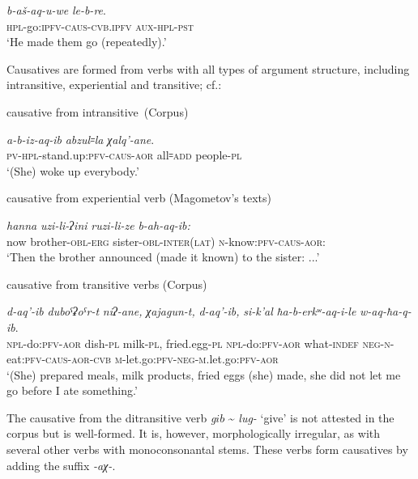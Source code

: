 \documentclass[output=paper]{langsci/langscibook}
\begin{document}
\ea %
\gll \emph{b-aš-aq-u-we} \emph{le-b-re}.\\
\textsc{hpl}-go:\textsc{ipfv}-\textsc{caus}-\textsc{cvb.ipfv} \textsc{aux}-\textsc{hpl}-\textsc{pst}\\
\glt `He made them go (repeatedly).'
\z

Causatives are formed from verbs with all types of argument structure,
including intransitive, experiential and transitive; cf.:

\ea %
causative from intransitive~(Corpus)

\gll \emph{a-b-iz-aq-ib} \emph{abzul꞊la} \emph{χalq'-ane}.\\
\textsc{pv}-\textsc{hpl}-stand.up:\textsc{pfv}-\textsc{caus}-\textsc{aor} all꞊\textsc{add} people-\textsc{pl}\\
\glt `(She) woke up everybody.'

\ex %
causative from experiential verb (Magometov's texts)

\nopagebreak

\gll \emph{hanna} \emph{uzi-li-ʔini} \emph{ruzi-li-ze} \emph{b-ah-aq-ib:}\\
now brother-\textsc{obl}-\textsc{erg} sister-\textsc{obl}-\textsc{inter}(\textsc{lat}) \textsc{n}-know:\textsc{pfv}-\textsc{caus}-\textsc{aor}:\\
\glt `Then the brother announced (made it known) to the sister: ...'

\ex %
causative from transitive verbs (Corpus)

\gll \emph{d-aq'-ib} \emph{duboˤʡoˤr-t} \emph{niʔ-ane,} \emph{χajagun-t,} \emph{d-aq'-ib,} \emph{si-k'al} \emph{ħa-b-erkʷ-aq-i-le} \emph{w-aq-ħa-q-ib}.\\
\textsc{npl}-do:\textsc{pfv}-\textsc{aor} dish-\textsc{pl} milk-\textsc{pl}, fried.egg-\textsc{pl} \textsc{npl}-do:\textsc{pfv}-\textsc{aor} what-\textsc{indef} \textsc{neg}-\textsc{n}-eat:\textsc{pfv}-\textsc{caus}-\textsc{aor}-\textsc{cvb} \textsc{m}-let.go:\textsc{pfv}-\textsc{neg}-\textsc{m}.let.go:\textsc{pfv}-\textsc{aor}\\
\glt `(She) prepared meals, milk products, fried eggs (she) made, she did not
let me go before I ate something.'

\z

The causative from the ditransitive verb \emph{g\(ib\)} \textasciitilde{}
\emph{lug-} `give' is not attested in the corpus but is well-formed. It
is, however, morphologically irregular, as with several other verbs with
monoconsonantal stems. These verbs form causatives by adding the suffix
\emph{-aχ-}.
\end{document}
